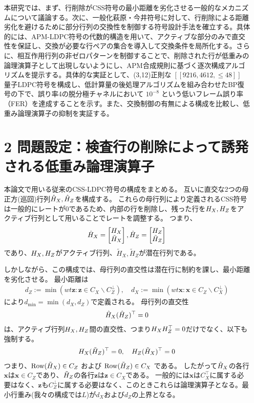\documentclass[a4paper,11pt,dvipdfmx]{jsarticle}
\theoremstyle{definition}
\begin{document}
本研究では、まず、行削除がCSS符号の最小距離を劣化させる一般的なメカニズムについて議論する。次に、一般化萩原・今井符号に対して、行削除による距離劣化を避けるために部分行列の交換性を制御する符号設計手法を確立する。具体的には、APM-LDPC符号の代数的構造を用いて、アクティブな部分のみで直交性を保証し、交換が必要な行ペアの集合を導入して交換条件を局所化する。さらに、相互作用行列の非ゼロパターンを制御することで、削除された行が低重みの論理演算子として出現しないようにし、APM合成規則に基づく逐次構成アルゴリズムを提示する。具体的な実証として、(3,12)正則な $[[9216, 4612, \le 48]]$ 量子LDPC符号を構成し、低計算量の後処理アルゴリズムを組み合わせたBP復号の下で、誤り率4の脱分極チャネルにおいて $10^{-8}$ という低いフレーム誤り率（FER）を達成することを示す。また、交換制御の有無による構成を比較し、低重み論理演算子の抑制を実証する。

\section*{2 問題設定：検査行の削除によって誘発される低重み論理演算子}
本論文で用いる従来のCSS-LDPC符号の構成をまとめる。
互いに直交な2つの母正方(巡回)行列$\hat{H}_X,\hat{H}_Z$を構成する。
これらの母行列により定義されるCSS符号は一般的にレートが0であるため、内部の行を削除し、残った行を$H_X,H_Z$をアクティブ行列として用いることでレートを調整する。
つまり、
\begin{align}
  \hat{H}_X = \begin{bmatrix}
    H_X \\ \tilde{H}_X
  \end{bmatrix},
  \hat{H}_Z = \begin{bmatrix}
    H_Z \\ \tilde{H}_Z
  \end{bmatrix}
\end{align}
であり、$H_X,H_Z$がアクティブ行列、$\tilde{H}_X,\tilde{H}_Z$が潜在行列である。

しかしながら、この構成では、母行列の直交性は潜在行に制約を課し、最小距離を劣化させる。
最小距離は
\begin{align}
  d_Z := \min({wt{\bm{z}}:\bm{z}\in C_X\backslash C_Z^\perp}),\quad
  d_X := \min({wt{\bm{x}}:\bm{x}\in C_Z\backslash C_X^\perp})
\end{align}
により$d_{\text{min}}=\min({d_X,d_Z})$で定義される。
母行列の直交性
\begin{align}
  \hat{H}_X(\hat{H}_Z)^\top = 0
\end{align}
は、アクティブ行列$H_X,H_Z$間の直交性、つまり$H_XH_Z^\top = 0$だけでなく、以下も強制する。
\begin{align}
  H_X(\tilde{H}_Z)^\top = 0, \quad
  H_Z(\tilde{H}_X)^\top = 0
\end{align}
つまり、$\text{Row}(\tilde{H}_X)\in C_Z$ および $\text{Row}(\tilde{H}_Z)\in C_X$ である。
したがって$\tilde{H}_X$の各行$\bm{x}$は$\bm{x}\in C_Z$であり、$\tilde{H}_Z$の各行$\bm{z}$は$\bm{z}\in C_X$である。
一般的には$\bm{x}$は$C_X^\top$に属する必要はなく、$\bm{z}$も$C_Z^\perp$に属する必要はなく、このときこれらは論理演算子となる。最小行重み(我々の構成では$L$)が$d_X$および$d_Z$の上界となる。
\end{document}
